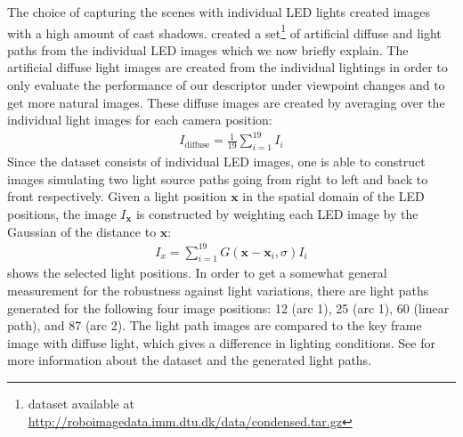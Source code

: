 \documentclass[thesis.tex]{subfiles}
\def\x{\mathbf{x}}
\begin{document}
The choice of capturing the scenes with individual LED lights created images with a high amount of cast shadows. \citet{larsen2012jet} created a set\footnote{dataset available at \url{http://roboimagedata.imm.dtu.dk/data/condensed.tar.gz}} of artificial diffuse and light paths from the individual LED images which we now briefly explain. The artificial diffuse light images are created from the individual lightings in order to only evaluate the performance of our descriptor under viewpoint changes and to get more natural images. These diffuse images are created by averaging over the individual light images for each camera position:
\begin{align}
	I_{\text{diffuse}} = \frac{1}{19} \sum_{i = 1}^{19} I_{i}
\end{align}
Since the dataset consists of individual LED images, one is able to construct images simulating two light source paths going from right to left and back to front respectively.
Given a light position $\x$ in the spatial domain of the LED positions, the image $I_\x$ is constructed by weighting each LED image by the Gaussian of the distance to $\x$:
\begin{align}
	I_{x} = \sum_{i = 1}^{19} G(\x - \x_i,\sigma) I_{i}
\end{align}
 shows the selected light positions. In order to get a somewhat general measurement for the robustness against light variations, there are light paths generated for the following four image positions: 12 (arc 1), 25 (arc 1), 60 (linear path), and 87 (arc 2). The light path images are compared to the key frame image with diffuse light, which gives a difference in lighting conditions.
See \citet{aanaes2010recall,aanaes2010ground,larsen2012jet} for more information about the dataset and the generated light paths.
\end{document}
